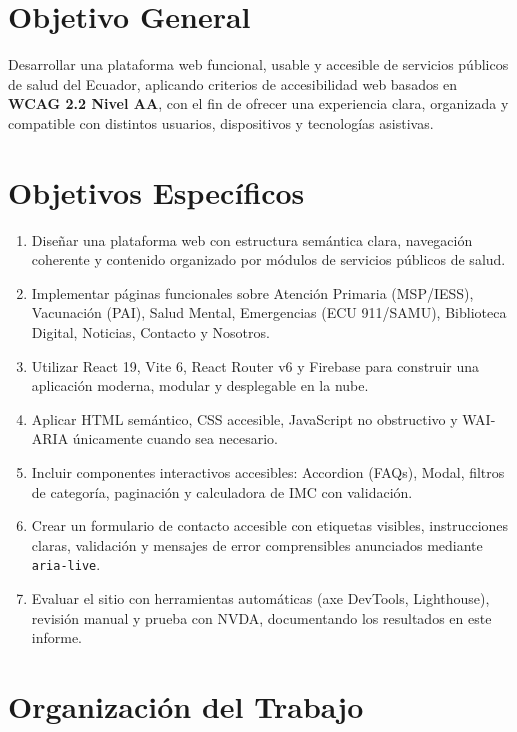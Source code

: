 \documentclass[12pt, a4paper]{article}
\begin{document}
\section{Objetivo General}

Desarrollar una plataforma web funcional, usable y accesible de servicios públicos de salud del Ecuador, aplicando criterios de accesibilidad web basados en \textbf{WCAG 2.2 Nivel AA}, con el fin de ofrecer una experiencia clara, organizada y compatible con distintos usuarios, dispositivos y tecnologías asistivas.

\section{Objetivos Específicos}

\begin{enumerate}
  \item Diseñar una plataforma web con estructura semántica clara, navegación coherente y contenido organizado por módulos de servicios públicos de salud.
  \item Implementar páginas funcionales sobre Atención Primaria (MSP/IESS), Vacunación (PAI), Salud Mental, Emergencias (ECU 911/SAMU), Biblioteca Digital, Noticias, Contacto y Nosotros.
  \item Utilizar React 19, Vite 6, React Router v6 y Firebase para construir una aplicación moderna, modular y desplegable en la nube.
  \item Aplicar HTML semántico, CSS accesible, JavaScript no obstructivo y WAI-ARIA únicamente cuando sea necesario.
  \item Incluir componentes interactivos accesibles: Accordion (FAQs), Modal, filtros de categoría, paginación y calculadora de IMC con validación.
  \item Crear un formulario de contacto accesible con etiquetas visibles, instrucciones claras, validación y mensajes de error comprensibles anunciados mediante \texttt{aria-live}.
  \item Evaluar el sitio con herramientas automáticas (axe DevTools, Lighthouse), revisión manual y prueba con NVDA, documentando los resultados en este informe.
\end{enumerate}

\section{Organización del Trabajo}
\end{document}
